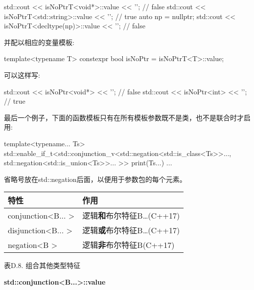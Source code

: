 \begin{cpp}
std::cout << isNoPtrT<void*>::value << '\n'; // false
std::cout << isNoPtrT<std::string>::value << '\n'; // true
auto np = nullptr;
std::cout << isNoPtrT<decltype(np)>::value << '\n'; // false
\end{cpp}

并配以相应的变量模板:

\begin{cpp}
template<typename T>
constexpr bool isNoPtr = isNoPtrT<T>::value;
\end{cpp}

可以这样写:

\begin{cpp}
std::cout << isNoPtr<void*> << '\n'; // false
std::cout << isNoPtr<int> << '\n'; // true
\end{cpp}

最后一个例子，下面的函数模板只有在所有模板参数既不是类，也不是联合时才启用:

\begin{cpp}
template<typename... Ts>
std::enable_if_t<std::conjunction_v<std::negation<std::is_class<Ts>>...,
									std::negation<std::is_union<Ts>>...
									>>
print(Ts...)
{
	...
}
\end{cpp}

省略号放在std::negation后面，以便用于参数包的每个元素。

\begin{table}[H]
	\begin{center}
	\begin{tabular}{l|l}
		\hline
		\textbf{特性}                            & \textbf{作用}                                   \\ \hline
		conjunction\textless{}B... \textgreater{} & 逻辑\textbf{和}布尔特征B…(C++17) \\ \hline
		disjunction\textless{}B... \textgreater{} & 逻辑\textbf{或}布尔特征B…(C++17)  \\ \hline
		negation\textless{}B \textgreater{}       & 逻辑\textbf{非}布尔特征B(C++17)     \\ \hline
	\end{tabular}
	\end{center}
\end{table}

\begin{center}
表D.8. 组合其他类型特征
\end{center}

\textbf{std::conjunction<B...>::value}

